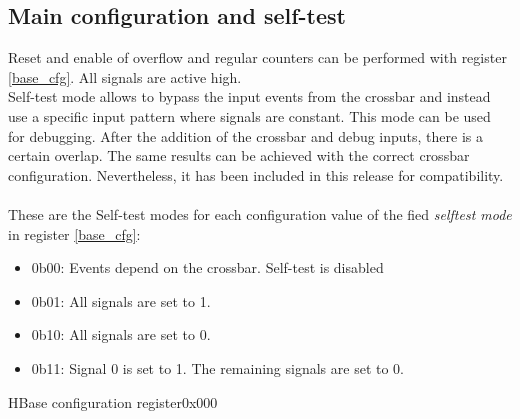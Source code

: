 \subsection{Main configuration and self-test}
Reset and enable of overflow and regular counters can be performed with register \ref{base_cfg}. All signals are active high.\\
Self-test mode allows to bypass the input events from the crossbar and instead use a specific input pattern where signals are constant. This mode can be used for debugging. After the addition of the crossbar and debug inputs, there is a certain overlap. The same results can be achieved with the correct crossbar configuration. Nevertheless, it has been included in this release for compatibility.\\
\\
These are the Self-test modes for each configuration value of the fied \textit{selftest mode} in register \ref{base_cfg}:
\begin{itemize}
	\item 0b00: Events depend on the crossbar. Self-test is disabled
	\item 0b01: All signals are set to 1.
	\item 0b10: All signals are set to 0.
	\item 0b11: Signal 0 is set to 1.  The remaining signals are set to 0.
\end{itemize}

 \begin{register}{H}{Base configuration register}{0x000}
   \label{base_cfg}
   \regnewline
  \end{register}

